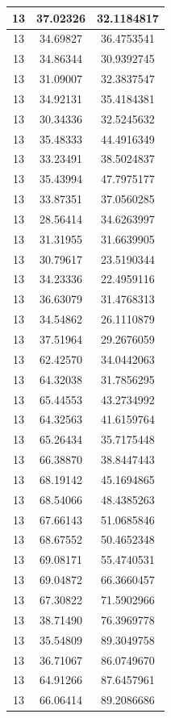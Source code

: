 \documentclass[
]{book}
\begin{document}
\begin{tabular}{c|c|c}
\hline
13 & 37.02326 & 32.1184817\\
\hline
13 & 34.69827 & 36.4753541\\
\hline
13 & 34.86344 & 30.9392745\\
\hline
13 & 31.09007 & 32.3837547\\
\hline
13 & 34.92131 & 35.4184381\\
\hline
13 & 30.34336 & 32.5245632\\
\hline
13 & 35.48333 & 44.4916349\\
\hline
13 & 33.23491 & 38.5024837\\
\hline
13 & 35.43994 & 47.7975177\\
\hline
13 & 33.87351 & 37.0560285\\
\hline
13 & 28.56414 & 34.6263997\\
\hline
13 & 31.31955 & 31.6639905\\
\hline
13 & 30.79617 & 23.5190344\\
\hline
13 & 34.23336 & 22.4959116\\
\hline
13 & 36.63079 & 31.4768313\\
\hline
13 & 34.54862 & 26.1110879\\
\hline
13 & 37.51964 & 29.2676059\\
\hline
13 & 62.42570 & 34.0442063\\
\hline
13 & 64.32038 & 31.7856295\\
\hline
13 & 65.44553 & 43.2734992\\
\hline
13 & 64.32563 & 41.6159764\\
\hline
13 & 65.26434 & 35.7175448\\
\hline
13 & 66.38870 & 38.8447443\\
\hline
13 & 68.19142 & 45.1694865\\
\hline
13 & 68.54066 & 48.4385263\\
\hline
13 & 67.66143 & 51.0685846\\
\hline
13 & 68.67552 & 50.4652348\\
\hline
13 & 69.08171 & 55.4740531\\
\hline
13 & 69.04872 & 66.3660457\\
\hline
13 & 67.30822 & 71.5902966\\
\hline
13 & 38.71490 & 76.3969778\\
\hline
13 & 35.54809 & 89.3049758\\
\hline
13 & 36.71067 & 86.0749670\\
\hline
13 & 64.91266 & 87.6457961\\
\hline
13 & 66.06414 & 89.2086686\\

\end{tabular}
\end{document}
